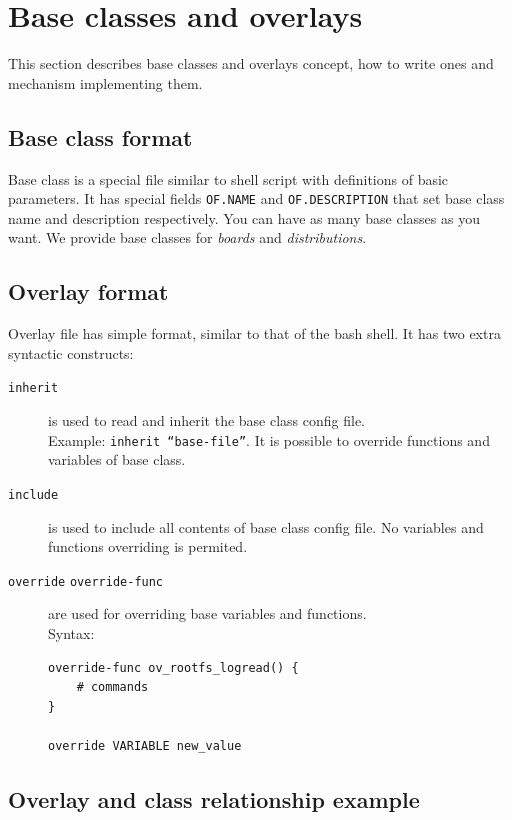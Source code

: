 \section{Base classes and overlays }
\label{sec:overlays}
This section describes base classes and overlays concept, how to write ones and mechanism implementing them.

\subsection{Base class format}

\label{subsec:fuegoclass_fmt}
Base class is a special file similar to shell script with definitions of basic parameters.
It has special fields \texttt{OF.NAME} and \texttt{OF.DESCRIPTION} that set base class name and description respectively.
You can have as many base classes as you want. We provide base classes for \emph{boards} and \emph{distributions}.

\subsection{Overlay format}
\label{subsec:overlay_fmt}
Overlay file has simple format, similar to that of the bash shell.
It has two extra syntactic constructs:
\begin{description}
\item[\texttt{inherit}] is used to read and inherit the base class config file.  \\Example:  \texttt{inherit ``base-file''}. It is possible to override functions and variables of base class.
\item[\texttt{include}] is used to include all contents of base class config file. No variables and functions overriding is permited.
\item[\texttt{override} \texttt{override-func}] are used for overriding base variables and functions.\\Syntax:
\begin{verbatim}
override-func ov_rootfs_logread() {
    # commands
}

override VARIABLE new_value
\end{verbatim}
\end{description}

\subsection{Overlay and class relationship example}
\label{sec:ov_class_example}

